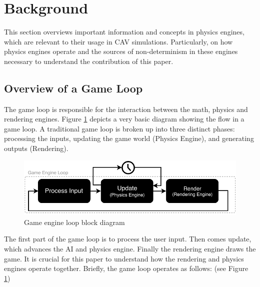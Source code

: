\section{Background}
\noindent This section overviews important information and concepts in physics engines, which are relevant to their usage in CAV simulations. 
Particularly, on how physics engines operate and the sources of non-determinism in these engines necessary to understand the contribution of this paper.
\subsection{Overview of a Game Loop}\label{GameLoopSection}
\noindent The game loop is responsible for the interaction between the math, physics and rendering engines\cite{GameEngineArchBook}.
Figure \ref{GameEngineLoopDiagram} depicts a very basic diagram showing the flow in a game loop. 
A traditional game loop is broken up into three distinct phases: processing the inputs, updating the game world (Physics Engine), and generating outputs (Rendering).
\begin{figure}[h]
\centering
\includegraphics[width=1\textwidth]{Other/Figures/GameEngineLoop.pdf}
\caption{Game engine loop block diagram}
\label{GameEngineLoopDiagram}
\end{figure}
The first part of the game loop is to process the user input. Then comes update, which advances the AI and physics engine. Finally the rendering engine draws the game\cite{GameProgPatternsBook}.
It is crucial for this paper to understand how the rendering and physics engines operate together.
Briefly, the game loop operates as follows:\cite{GameProgPatternsBook} (see Figure \ref{GameEngineLoopDiagram})
